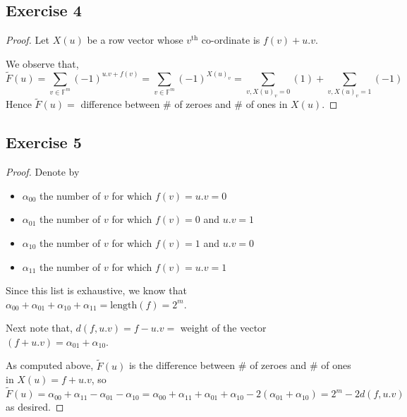 \documentclass[12pt]{article}
\begin{document}
\subsection*{Exercise 4}
\begin{proof}
Let $X(u)$ be a row vector whose $v^{\text{th}}$ co-ordinate is $f(v) + u.v$.

We observe that, 
$$\tilde{F}(u) = \sum_{v \in \mathbb{F}^m} (-1)^{u.v+f(v)} = \sum_{v \in \mathbb{F}^m} (-1)^{X(u)_v} = \sum_{v, X(u)_v = 0} (1) + \sum_{v, X(u)_v = 1} (-1)$$
Hence $\tilde{F}(u) = $ difference between \# of zeroes and \# of ones in $X(u)$.
\end{proof}

\subsection*{Exercise 5}
\begin{proof}
Denote by 
\begin{itemize}
    \item $\alpha_{00}$ the number of $v$ for which $f(v) = u.v = 0$
    \item $\alpha_{01}$ the number of $v$ for which $f(v) = 0$ and $u.v = 1$
    \item $\alpha_{10}$ the number of $v$ for which $f(v) = 1$ and $u.v = 0$
    \item $\alpha_{11}$ the number of $v$ for which $f(v) = u.v = 1$
\end{itemize}
Since this list is exhaustive, we know that $\alpha_{00} + \alpha_{01} + \alpha_{10} + \alpha_{11} = \text{length}(f) = 2^m$.

Next note that, $d(f, u.v) = f - u.v = $ weight of the vector $(f + u.v) = \alpha_{01} + \alpha_{10}$.

As computed above, $\tilde{F}(u)$ is the difference between \# of zeroes and \# of ones in $X(u) = f + u.v$, so $$\tilde{F}(u) = \alpha_{00} + \alpha_{11} - \alpha_{01} - \alpha_{10} = \alpha_{00} + \alpha_{11} + \alpha_{01} + \alpha_{10} - 2(\alpha_{01} + \alpha_{10}) = 2^m - 2d(f,u.v)$$ as desired.
\end{proof}
\end{document}
